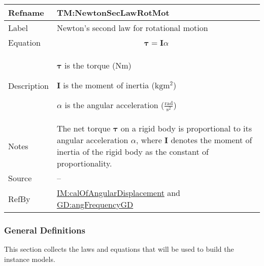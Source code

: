 \documentclass[12pt]{article}
\begin{document}
\begin{minipage}{\textwidth}
\begin{tabular}{>{\raggedright}p{}>{\raggedright\arraybackslash}p{}}
\toprule \textbf{Refname} & \textbf{TM:NewtonSecLawRotMot}
\label{TM:NewtonSecLawRotMot}
\\ \midrule
Label & Newton's second law for rotational motion
        
\\ \midrule
Equation & \begin{displaymath}
           \symbf{τ}=\symbf{I} α
           \end{displaymath}
\\ \midrule
Description & \begin{symbDescription}
              \item{$\symbf{τ}$ is the torque ($\text{N}\text{m}$)}
              \item{$\symbf{I}$ is the moment of inertia ($\text{kg}\text{m}^{2}$)}
              \item{$α$ is the angular acceleration ($\frac{\text{rad}}{\text{s}^{2}}$)}
              \end{symbDescription}
\\ \midrule
Notes & The net torque $\symbf{τ}$ on a rigid body is proportional to its angular acceleration $α$, where $\symbf{I}$ denotes the moment of inertia of the rigid body as the constant of proportionality.
        
\\ \midrule
Source & --
         
\\ \midrule
RefBy & \hyperref[IM:calOfAngularDisplacement]{IM:calOfAngularDisplacement} and \hyperref[GD:angFrequencyGD]{GD:angFrequencyGD}
        
\\ \bottomrule
\end{tabular}
\end{minipage}
\subsubsection{General Definitions}
\label{Sec:GDs}
This section collects the laws and equations that will be used to build the instance models.
\end{document}
